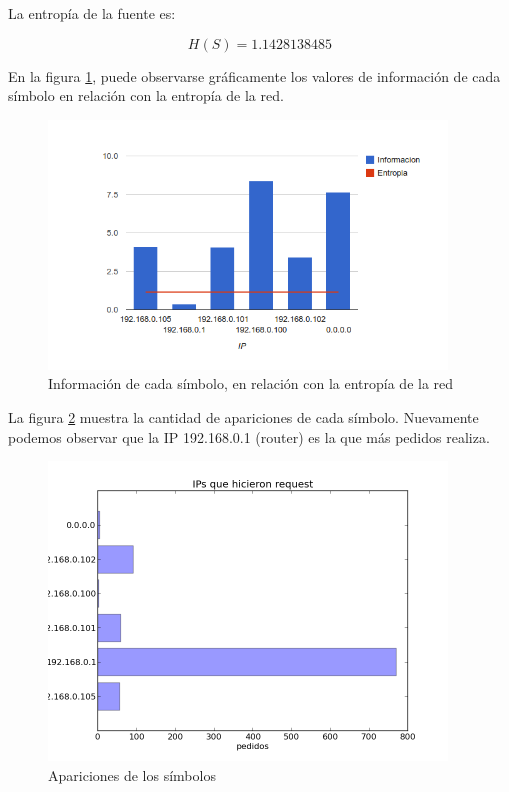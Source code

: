 \documentclass{article}
\begin{document}
\vskip10pt

La entropía de la fuente es:

$$H(S) = 1.1428138485$$

En la figura \ref{fig:red2requesters:infoentro}, puede observarse gráficamente
los valores de información de cada símbolo en relación con la entropía de la
red.

\begin{figure}[h!]
    \centering                                                       
    \includegraphics[width=300pt]{red2/consultas2.png}
    \caption{Información de cada símbolo, en relación con la
        entropía de la red}
    \label{fig:red2requesters:infoentro}
\end{figure}

La figura \ref{fig:red2requesters:count} muestra la cantidad de apariciones de
cada símbolo. Nuevamente podemos observar que la IP 192.168.0.1 (router) es la que más pedidos realiza.

\begin{figure}[h!]
    \centering                                                       
    \includegraphics[width=300pt]{red2/red2requesters.png}
    \caption{Apariciones de los símbolos}
    \label{fig:red2requesters:count}
\end{figure}
\end{document}
